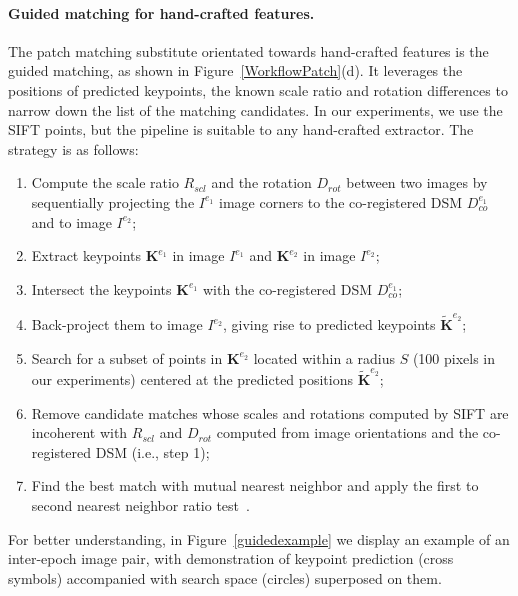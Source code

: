 \paragraph{Guided matching for hand-crafted features.} 
The patch matching substitute orientated towards hand-crafted features is the guided matching, as shown in Figure~\ref{WorkflowPatch}(d). It leverages the positions of predicted keypoints, {the known scale ratio and rotation differences to narrow down the list of the matching candidates}. In our experiments, we use the SIFT points, but the pipeline is suitable to any hand-crafted extractor. 
The strategy {is as follows}:\\
\begin{enumerate}
	\item {Compute the scale ratio $R_{scl}$ and the rotation $D_{rot}$ between two images by sequentially projecting the $I^{e_1}$ image corners to the co-registered DSM $D_{co}^{e_1}$ and to image $I^{e_2}$;} %
	\item Extract keypoints $\mathbf{K}^{e_1}$ in image $I^{e_1}$ and $\mathbf{K}^{e_2}$ in image $I^{e_2}$;
	\item Intersect the keypoints $\mathbf{K}^{e_1}$ with the co-registered DSM $D_{co}^{e_1}$;
	\item Back-project them to image $I^{e_2}$, giving rise to predicted keypoints $\widetilde{\mathbf{K}}^{e_2}$;
	\item Search for a subset of points in $\mathbf{K}^{e_2}$ located within a radius $S$ (100 pixels in our experiments) centered at the predicted positions $\widetilde{\mathbf{K}}^{e_2}$;%
	\item {Remove candidate matches whose scales and rotations computed by SIFT are incoherent with $R_{scl}$ and $D_{rot}$ computed from image orientations and the co-registered DSM (i.e., step 1);}
	\item {Find the best match with mutual nearest neighbor and apply the first to second nearest neighbor ratio test~\cite{lowe2004distinctive}.}
\end{enumerate}
For better understanding, in Figure~\ref{guidedexample} we display an example of an inter-epoch image pair, with demonstration of keypoint prediction (cross symbols) accompanied with search space (circles) superposed on them.\\

